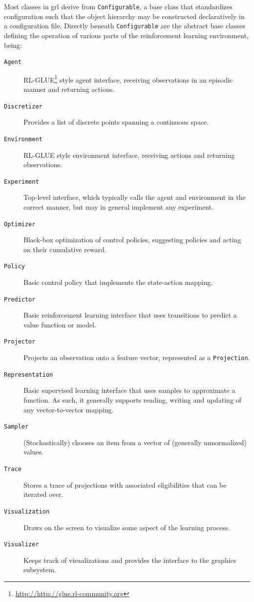 \documentclass{article}
\newcommand{\txt}[1]{\texttt{#1}}
\begin{document}
Most classes in grl derive from \txt{Configurable}, a base class that
standardizes configuration such that the object hierarchy may be constructed
declaratively in a configuration file. Directly beneath \txt{Configurable}
are the abstract base classes defining the operation of various parts of the
reinforcement learning environment, being:
\begin{description}
\item[\txt{Agent}] RL-GLUE\footnote{\url{http://http://glue.rl-community.org}}
style agent interface, receiving observations in an episodic manner and returning
actions.
\item[\txt{Discretizer}] Provides a list of discrete points spanning a
continuous space.
\item[\txt{Environment}] RL-GLUE style environment interface, receiving
actions and returning observations.
\item[\txt{Experiment}] Top-level interface, which typically calls the agent
and environment in the correct manner, but may in general implement any
experiment.
\item[\txt{Optimizer}] Black-box optimization of control policies,
suggesting policies and acting on their cumulative reward.
\item[\txt{Policy}] Basic control policy that implements the state-action
mapping.
\item[\txt{Predictor}] Basic reinforcement learning interface that uses
transitions to predict a value function or model.
\item[\txt{Projector}] Projects an observation onto a feature vector,
represented as a \txt{Projection}.
\item[\txt{Representation}] Basic supervised learning interface that uses
samples to approximate a function. As such, it generally supports reading,
writing and updating of any vector-to-vector mapping.
\item[\txt{Sampler}] (Stochastically) chooses an item from a vector of (generally
unnormalized) values.
\item[\txt{Trace}] Stores a trace of projections with associated
eligibilities that can be iterated over.
\item[\txt{Visualization}] Draws on the screen to visualize some aspect of
the learning process.
\item[\txt{Visualizer}] Keeps track of visualizations and provides the
interface to the graphics subsystem.
\end{description}
\end{document}
